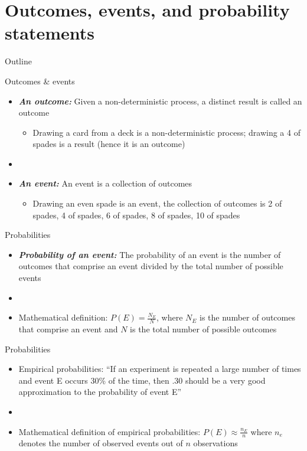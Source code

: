 \documentclass[xcolor=dvipsnames]{beamer}
\begin{document}
\section{Outcomes, events, and probability statements}
\begin{frame}{Outline}
\tableofcontents[currentsection,subsectionstyle=show/shaded/hide]
\end{frame}

\begin{frame}{Outcomes \& events}
	\begin{itemize}
		\item \textbf{\emph{An outcome:}} Given a non-deterministic process, a distinct result is called an outcome \pause
		\begin{itemize}
			\item Drawing a card from a deck is a non-deterministic process; drawing a 4 of spades is a result (hence it is an outcome) \pause
		\end{itemize}
		\item[]
		\item \textbf{\emph{An event:}} An event is a collection of outcomes \pause
		\begin{itemize}
			\item Drawing an even spade is an event, the collection of outcomes is {2 of spades, 4 of spades, 6 of spades, 8 of spades, 10 of spades}
		\end{itemize}
	\end{itemize}
\end{frame}

\begin{frame}{Probabilities}
	\begin{itemize}
		\item \textbf{\emph{Probability of an event:}} The probability of an event is the number of outcomes that comprise an event divided by the total number of possible events \pause
		\item[]
		\item Mathematical definition: $P(E) = \frac{N_E}{N}$, where $N_E$ is the number of outcomes that comprise an event and $N$ is the total number of possible outcomes 
	\end{itemize}
\end{frame}

\begin{frame}{Probabilities}
\begin{itemize}
	\item Empirical probabilities: ``If an experiment is
	repeated a large number of times and event E occurs 30\% of the time, then .30
	should be a very good approximation to the probability of event E'' \pause
	\item[] 
	\item Mathematical definition of empirical probabilities: $P(E) \approx \frac{n_E}{n}$ where $n_e$ denotes the number of observed events out of $n$ observations
\end{itemize}
\end{frame}
\end{document}
